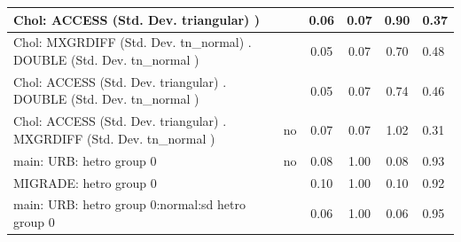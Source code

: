 \begin{table}
\begin{center}
\begin{tabular}{|l|l|c|c|c|l|}
			\hline
			 Chol: ACCESS (Std. Dev. triangular) ) &  & 0.06 & 0.07 & 0.90 & 0.37 \\
			\hline
			 Chol: MXGRDIFF (Std. Dev. tn_normal) . DOUBLE (Std. Dev.   tn_normal ) &  & 0.05 & 0.07 & 0.70 & 0.48 \\
			\hline
			 Chol: ACCESS (Std. Dev. triangular) . DOUBLE (Std. Dev.   tn_normal ) &  & 0.05 & 0.07 & 0.74 & 0.46 \\
			\hline
			 Chol: ACCESS (Std. Dev. triangular) . MXGRDIFF (Std. Dev.   tn_normal ) & no & 0.07 & 0.07 & 1.02 & 0.31 \\
			\hline
			main: URB: hetro group 0 & no & 0.08 & 1.00 & 0.08 & 0.93 \\
			\hline
			MIGRADE: hetro group 0 &  & 0.10 & 1.00 & 0.10 & 0.92 \\
			\hline
			main: URB: hetro group 0:normal:sd  hetro group 0 &  & 0.06 & 1.00 & 0.06 & 0.95 \\
			\hline
		\end{tabular}
	\end{center}
\end{table}
